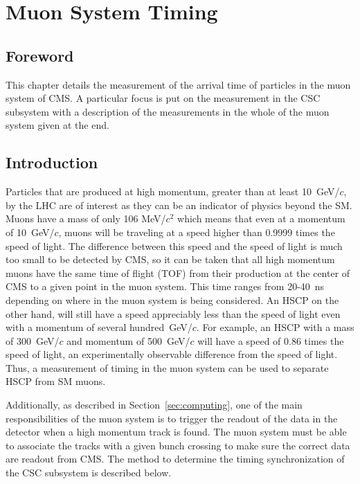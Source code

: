 \chapter{Muon System Timing \label{sec:timing}}

\section{Foreword}
This chapter details the measurement of the arrival time of particles in the muon system of CMS. A particular focus is put on the measurement in the CSC subsystem
with a description of the measurements in the whole of the muon system given at the end. 

\section{Introduction}
Particles that are produced at high momentum, greater than at least 10~GeV/$c$, by the LHC are of interest as they can be an indicator of physics
beyond the SM. Muons have a mass of only 106 MeV/$c^2$ which means that even at a momentum of 10~GeV/$c$, muons will be traveling at a speed higher than 0.9999
times the speed of light. The difference between this speed and the speed of light is much too small to be detected by CMS, so it can be
taken that all high momentum muons have the same time of flight (TOF) from their production at the center of CMS to a given point in the muon system.
This time ranges from 20-40~ns depending on where in the muon system is being considered. An HSCP on the other hand, will still have a speed appreciably less than the speed
of light even with a momentum of several hundred~GeV/$c$. For example, an HSCP with a mass of 300~GeV/$c$ and momentum of 500~GeV/$c$ will have a speed of
0.86 times the speed of light, an experimentally observable difference from the speed of light.
Thus, a measurement of timing in the muon system can be used to separate HSCP from SM muons.

Additionally, as described in Section~\ref{sec:computing}, one of the main responsibilities  of the muon system is to trigger the readout of the data in the detector
when a high momentum track is found. The muon system must be able to associate the tracks with a given bunch crossing to make sure the correct data are readout from CMS.
The method to determine the timing synchronization of the CSC subsystem is described below.

